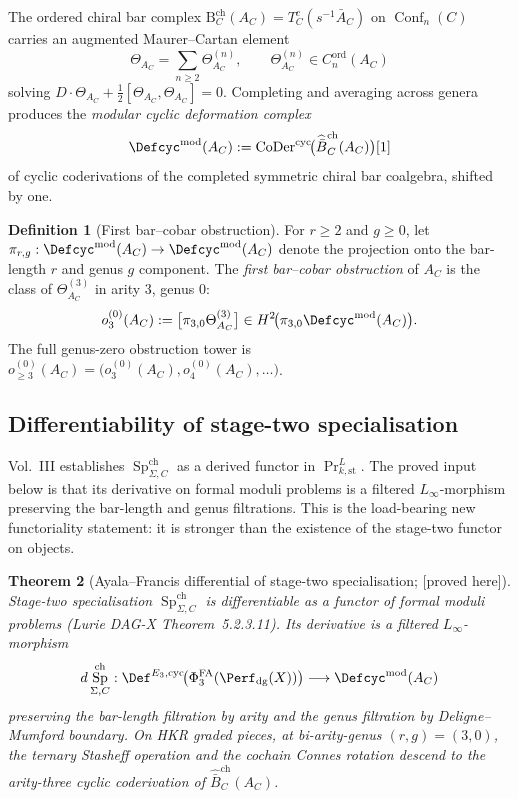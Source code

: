 \documentclass[11pt,reqno]{amsart}
\theoremstyle{plain}
\newtheorem{theorem}{Theorem}[section]
\theoremstyle{definition}
\newtheorem{definition}[theorem]{Definition}
\theoremstyle{remark}
\providecommand{\ClaimStatusProvedHere}{\textnormal{[proved here]}}
\DeclareMathOperator{\Sp}{Sp}
\DeclareMathOperator{\Conf}{Conf}
\newcommand{\Bar}{\mathrm{B}}
\begin{document}
The ordered chiral bar complex $\Bar^{\mathrm{ch}}_C(A_C)
=T^c_C(s^{-1}\bar A_C)$ on $\Conf_n(C)$ carries an augmented Maurer--Cartan
element
\[
  \Theta_{A_C}
  =\sum_{n\geq 2}\Theta_{A_C}^{(n)},
  \qquad
  \Theta_{A_C}^{(n)}\in C_n^{\mathrm{ord}}(A_C)
\]
solving
$D\cdot\Theta_{A_C}+\tfrac{1}{2}[\Theta_{A_C},\Theta_{A_C}]=0$.
Completing and averaging across genera produces the
\emph{modular cyclic deformation complex}
\[
  \Defcyc^{\mathrm{mod}}(A_C)
  :=\operatorname{CoDer}^{\mathrm{cyc}}
  \!\bigl(\widehat{\bar B}^{\mathrm{ch}}_C(A_C)\bigr)[1]
\]
of cyclic coderivations of the completed symmetric chiral bar
coalgebra, shifted by one.

\begin{definition}[First bar--cobar obstruction]
\label{def:first-barcobar-obstruction}
For $r\geq 2$ and $g\geq 0$, let
$\pi_{r,g}:\Defcyc^{\mathrm{mod}}(A_C)\to\Defcyc^{\mathrm{mod}}(A_C)$
denote the projection onto the bar-length $r$ and genus $g$ component.
The \emph{first bar--cobar obstruction} of $A_C$ is the class of
$\Theta_{A_C}^{(3)}$ in arity $3$, genus $0$:
\[
  o^{(0)}_3(A_C)
  :=
  \bigl[\pi_{3,0}\Theta_{A_C}^{(3)}\bigr]
  \in H^2\!\bigl(\pi_{3,0}\Defcyc^{\mathrm{mod}}(A_C)\bigr).
\]
The full genus-zero obstruction tower is
$o^{(0)}_{\geq 3}(A_C)
=\bigl(o^{(0)}_3(A_C),o^{(0)}_4(A_C),\ldots\bigr)$.
\end{definition}

\subsection{Differentiability of stage-two specialisation}

Vol.~III establishes $\Sp^{\mathrm{ch}}_{\Sigma,C}$ as a derived
functor in $\Pr^L_{k,\mathrm{st}}$. The proved input below is that
its derivative on formal moduli problems is a filtered
$L_\infty$-morphism preserving the bar-length and genus
filtrations. This is the load-bearing new functoriality statement: it
is stronger than the existence of the stage-two functor on objects.

\begin{theorem}[Ayala--Francis differential of stage-two specialisation; \ClaimStatusProvedHere]
\label{thm:sp-differentiable}
Stage-two specialisation $\Sp^{\mathrm{ch}}_{\Sigma,C}$ is
differentiable as a functor of formal moduli problems (Lurie DAG-X
Theorem~5.2.3.11). Its derivative is a filtered $L_\infty$-morphism
\[
  d\Sp^{\mathrm{ch}}_{\Sigma,C}:
  \Def^{E_3,\mathrm{cyc}}
  \!\bigl(\Phi^{\mathrm{FA}}_3(\Perf_{\mathrm{dg}}(X))\bigr)
  \longrightarrow
  \Defcyc^{\mathrm{mod}}(A_C)
\]
preserving the bar-length filtration by arity and the genus filtration
by Deligne--Mumford boundary. On HKR graded pieces, at bi-arity-genus
$(r,g)=(3,0)$, the ternary Stasheff operation and the cochain Connes
rotation descend to the arity-three cyclic coderivation of
$\widehat{\bar B}^{\mathrm{ch}}_C(A_C)$.
\end{theorem}
\end{document}
